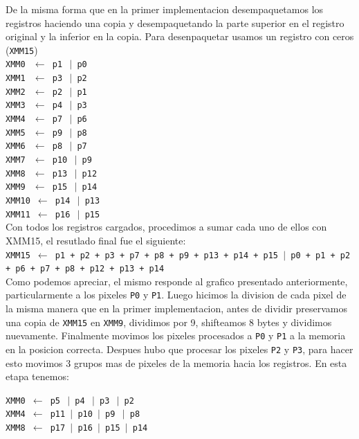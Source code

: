 De la misma forma que en la primer implementacion desempaquetamos los registros haciendo una copia y desempaquetando la parte superior en el registro original y la inferior en la copia. Para desenpaquetar usamos un registro con ceros (\texttt{XMM15}) \\

\noindent
\texttt{XMM0 $\ \gets$ p1 $\ \vert$ p0} \\
\texttt{XMM1 $\ \gets$ p3 $\ \vert$ p2} \\
\texttt{XMM2 $\ \gets$ p2 $\ \vert$ p1} \\
\texttt{XMM3 $\ \gets$ p4 $\ \vert$ p3} \\ 
\texttt{XMM4 $\ \gets$ p7 $\ \vert$ p6} \\
\texttt{XMM5 $\ \gets$ p9 $\ \vert$ p8} \\
\texttt{XMM6 $\ \gets$ p8 $\ \vert$ p7} \\
\texttt{XMM7 $\ \gets$ p10 $\ \vert$ p9} \\
\texttt{XMM8 $\ \gets$ p13 $\ \vert$ p12} \\
\texttt{XMM9 $\ \gets$ p15 $\ \vert$ p14} \\ 
\texttt{XMM10 $\gets$ p14 $\ \vert$ p13} \\
\texttt{XMM11 $\gets$ p16 $\ \vert$ p15} \\

Con todos los registros cargados, procedimos a sumar cada uno de ellos con XMM15, el resutlado final fue el siguiente:\\

\noindent
\texttt{XMM15 $\gets$ p1 + p2 + p3 + p7 + p8 + p9 + p13 + p14 + p15 $\vert$ p0 + p1 + p2 + p6 + p7 + p8 + p12 + p13 + p14}\\

Como podemos apreciar, el mismo responde al grafico presentado anteriormente, particularmente a los pixeles \texttt{P0} y \texttt{P1}. Luego hicimos la division de cada pixel de la misma manera que en la primer implementacion, antes de dividir preservamos una copia de \texttt{XMM15} en \texttt{XMM9}, dividimos por 9, shifteamos 8 bytes y dividimos nuevamente. Finalmente movimos los pixeles procesados a \texttt{P0} y \texttt{P1} a la memoria en la posicion correcta. Despues hubo que procesar los pixeles \texttt{P2} y \texttt{P3}, para hacer esto movimos 3 grupos mas de pixeles de la memoria hacia los registros. En esta etapa tenemos:

\noindent
\texttt{XMM0 $\gets$ p5 $\ \vert$ p4 $\ \vert$ p3 $\ \vert$ p2}\\
\texttt{XMM4 $\gets$ p11 $\vert$ p10 $\vert$ p9 $\ \vert$ p8}\\
\texttt{XMM8 $\gets$ p17 $\vert$ p16 $\vert$ p15 $\vert$ p14}\\


